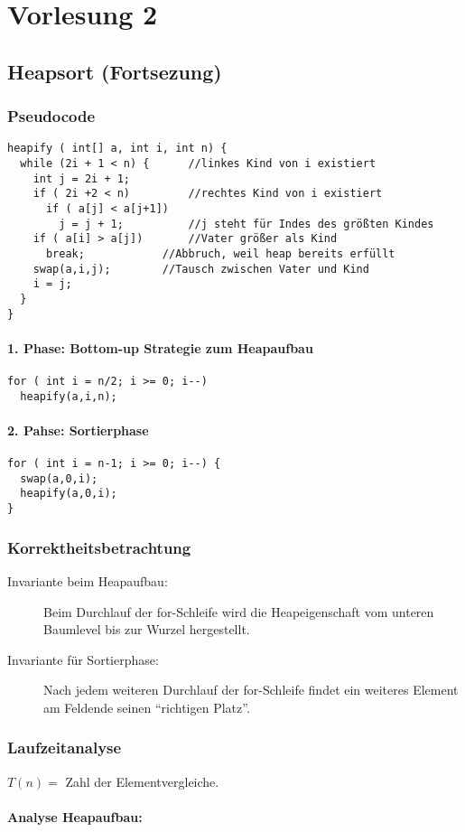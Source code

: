\chapter{Vorlesung 2}
\section*{Heapsort (Fortsezung)}
\subsection{Pseudocode}
\begin{lstlisting}
heapify ( int[] a, int i, int n) {
  while (2i + 1 < n) {		//linkes Kind von i existiert
    int j = 2i + 1;
    if ( 2i +2 < n)  		//rechtes Kind von i existiert
      if ( a[j] < a[j+1])
        j = j + 1;  		//j steht für Indes des größten Kindes
    if ( a[i] > a[j])  		//Vater größer als Kind
      break;  			//Abbruch, weil heap bereits erfüllt
    swap(a,i,j); 		//Tausch zwischen Vater und Kind
    i = j;
  }
}
\end{lstlisting}
\subsubsection{1. Phase: Bottom-up Strategie zum Heapaufbau}
\begin{lstlisting}
for ( int i = n/2; i >= 0; i--)
  heapify(a,i,n);
\end{lstlisting}
\subsubsection{2. Pahse: Sortierphase}
\begin{lstlisting}
for ( int i = n-1; i >= 0; i--) {
  swap(a,0,i);
  heapify(a,0,i);
}
\end{lstlisting}
\subsection{Korrektheitsbetrachtung}
\begin{description}
	\item[Invariante beim Heapaufbau:] Beim Durchlauf der for-Schleife wird die Heapeigenschaft vom unteren Baumlevel bis zur Wurzel hergestellt.
	\item[Invariante für Sortierphase:] Nach jedem weiteren Durchlauf der for-Schleife findet ein weiteres Element am Feldende seinen "`richtigen Platz"'.
\end{description}
\subsection{Laufzeitanalyse}
$T(n)=$ Zahl der Elementvergleiche.
\subsubsection{Analyse Heapaufbau:}
\[  \]%